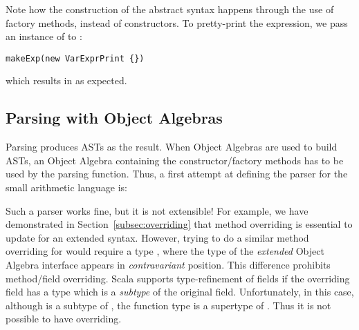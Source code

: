Note how the construction of the abstract syntax happens through
the use of factory methods, instead of constructors.
To pretty-print the expression,
we pass an instance of  to :

\begin{lstlisting}
makeExp(new VarExprPrint {})
\end{lstlisting}
which results in  as expected.

\subsection{Parsing with Object Algebras}\label{subsec:parsingwithoa}

Parsing produces ASTs as the result. When Object Algebras are used
to build ASTs, an Object Algebra containing the constructor/factory
methods has to be used by the parsing function. Thus, a first attempt
at defining the parser for the small arithmetic language is:

\begin{comment}
\inlinecode{ExprAlg} is defined for a small language using Object Algebras. Since Object Algebras represent ``objects'' implicitly as functions like \inlinecode{ExprAlg[E] =>} \inlinecode{E} for abstract \inlinecode{E}, we first try to build the corresponding parser by type \inlinecode{ExprAlg[E] =>} \inlinecode{Parser[E]}.
\end{comment}

Such a parser works fine, but it is not extensible! For example, we have demonstrated in Section~\ref{subsec:overriding} that method overriding is essential to update  for an extended syntax. However, trying to do a similar method overriding for  would require a type  , where the type of the \emph{extended} Object Algebra interface appears in \emph{contravariant} position. This difference prohibits method/field overriding. Scala supports type-refinement of fields if the overriding
field has a type which is a \emph{subtype} of the original field.
Unfortunately, in this case, although  is a subtype
of , the function type   is a supertype of  . Thus it is not possible to have overriding.

